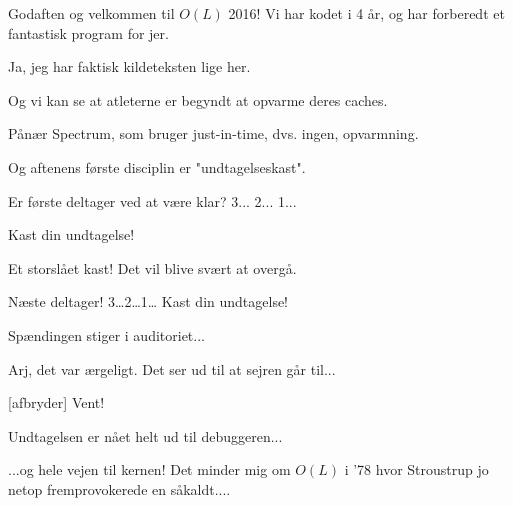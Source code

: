 \documentclass[a4paper,11pt]{article}
\begin{document}
\begin{sketch}


   Godaften og velkommen til $O(L)$ 2016! Vi har kodet i 4 år, og har
  forberedt et fantastisk program for jer.

   Ja, jeg har faktisk kildeteksten lige her.

   Og vi kan se at atleterne er begyndt at opvarme deres caches.

   Pånær Spectrum, som bruger just-in-time, dvs. ingen, opvarmning.

   Og aftenens første disciplin er "undtagelseskast".


   Er første deltager ved at være klar? 3... 2... 1...

   Kast din undtagelse!


   Et storslået kast!  Det vil blive svært at overgå.

   Næste deltager! 3\ldots 2\ldots 1\ldots
   Kast din undtagelse!


   Spændingen stiger i auditoriet...


   Arj, det var ærgeligt.  Det ser ud til at sejren går til...

  [afbryder] Vent!


   Undtagelsen er nået helt ud til debuggeren...


   ...og hele vejen til kernen!  Det minder mig om $O(L)$ i
  '78 hvor Stroustrup jo netop fremprovokerede en såkaldt....


\end{sketch}
\end{document}

